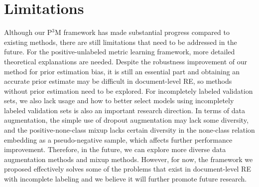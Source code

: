 \documentclass[11pt]{article}
\begin{document}
\section{Limitations}
Although our P$^{3}$M framework has made substantial progress compared to existing methods, there are still limitations that need to be addressed in the future. For the positive-unlabeled metric learning framework, more detailed theoretical explanations are needed. Despite the robustness improvement of our method for prior estimation bias, it is still an essential part and obtaining an accurate prior estimate may be difficult in document-level RE, so methods without prior estimation need to be explored. For incompletely labeled validation sets, we also lack usage and how to better select models using incompletely labeled validation sets is also an important research direction. In terms of data augmentation, the simple use of dropout augmentation may lack some diversity, and the positive-none-class mixup lacks certain diversity in the none-class relation embedding as a pseudo-negative sample, which affects further performance improvement. Therefore, in the future, we can explore more diverse data augmentation methods and mixup methods. However, for now, the framework we proposed effectively solves some of the problems that exist in document-level RE with incomplete labeling and we believe it will further promote future research.


\end{document}
